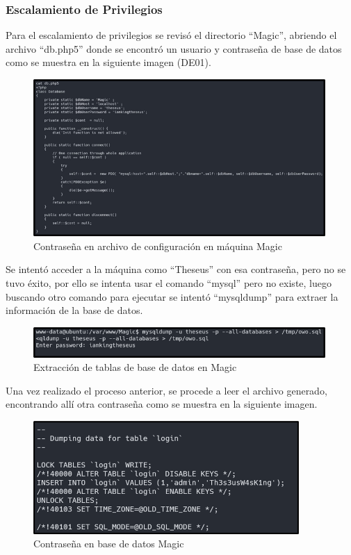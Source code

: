 \subsubsection{Escalamiento de Privilegios}
Para el escalamiento de privilegios se revisó el directorio “Magic”, abriendo el archivo “db.php5” donde se encontró un usuario y contraseña de base de datos como se muestra en la siguiente imagen (DE01).
\begin{figure}[H]
    \centering
    \includegraphics[width=0.99\textwidth]{imagenes/conarma.png}
    \caption{Contraseña en archivo de configuración en máquina Magic}
\end{figure}
Se intentó acceder a la máquina como “Theseus” con esa contraseña, pero no se tuvo éxito, por ello se intenta usar el comando “mysql” pero no existe, luego buscando otro comando para ejecutar se intentó “mysqldump” para extraer la información de la base de datos.
\begin{figure}[H]
    \centering
    \includegraphics[width=0.99\textwidth]{imagenes/basemag.png}
    \caption{Extracción de tablas de base de datos en Magic}
\end{figure}
Una vez realizado el proceso anterior, se procede a leer el archivo generado, encontrando allí otra contraseña como se muestra en la siguiente imagen.
\begin{figure}[H]
    \centering
    \includegraphics[width=0.9\textwidth]{imagenes/tabmag.png}
    \caption{Contraseña en base de datos Magic}
\end{figure}
